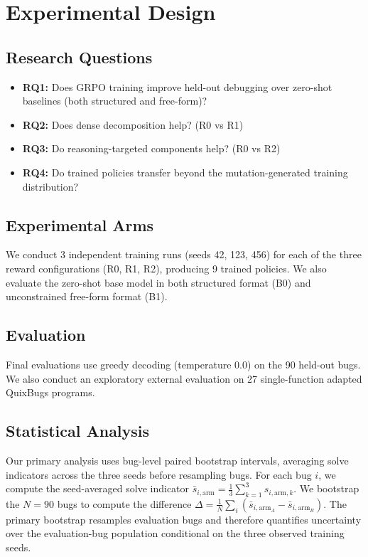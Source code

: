 \documentclass{article}
\begin{document}
\section{Experimental Design}

\subsection{Research Questions}
\begin{itemize}
\item \textbf{RQ1:} Does GRPO training improve held-out debugging over zero-shot baselines (both structured and free-form)?
\item \textbf{RQ2:} Does dense decomposition help? (R0 vs R1)
\item \textbf{RQ3:} Do reasoning-targeted components help? (R0 vs R2)
\item \textbf{RQ4:} Do trained policies transfer beyond the mutation-generated training distribution?
\end{itemize}

\subsection{Experimental Arms}
We conduct 3 independent training runs (seeds 42, 123, 456) for each of the three reward configurations (R0, R1, R2), producing 9 trained policies. We also evaluate the zero-shot base model in both structured format (B0) and unconstrained free-form format (B1).

\subsection{Evaluation}
Final evaluations use greedy decoding (temperature 0.0) on the 90 held-out bugs. We also conduct an exploratory external evaluation on 27 single-function adapted QuixBugs programs.

\subsection{Statistical Analysis}
Our primary analysis uses bug-level paired bootstrap intervals, averaging solve indicators across the three seeds before resampling bugs. For each bug $i$, we compute the seed-averaged solve indicator $\bar{s}_{i,\text{arm}} = \frac{1}{3}\sum_{k=1}^{3}s_{i,\text{arm},k}$. We bootstrap the $N=90$ bugs to compute the difference $\Delta = \frac{1}{N}\sum_i (\bar{s}_{i,\text{arm}_A}-\bar{s}_{i,\text{arm}_B})$. The primary bootstrap resamples evaluation bugs and therefore quantifies uncertainty over the evaluation-bug population conditional on the three observed training seeds. 
\end{document}
